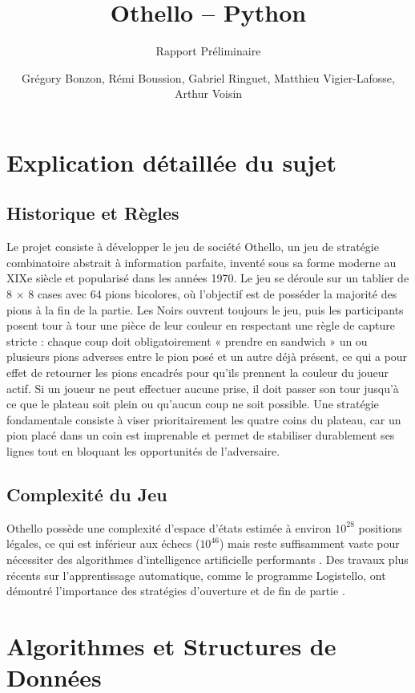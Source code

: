 \documentclass[a4paper]{article}
\title{Othello -- Python}
\subtitle{Rapport Préliminaire}
\author{
    Grégory Bonzon,
    Rémi Boussion,
    Gabriel Ringuet,
    Matthieu Vigier-Lafosse,
    Arthur Voisin
}
\begin{document}
\maketitle
\thispagestyle{empty}


\section{Explication détaillée du sujet}

\subsection{Historique et Règles}
Le projet consiste à développer le jeu de société Othello, un jeu de stratégie combinatoire abstrait à information parfaite, inventé sous sa forme moderne au XIXe siècle et popularisé dans les années 1970. Le jeu se déroule sur un tablier de 8 × 8 cases avec 64 pions bicolores, où l'objectif est de posséder la majorité des pions à la fin de la partie. Les Noirs ouvrent toujours le jeu, puis les participants posent tour à tour une pièce de leur couleur en respectant une règle de capture stricte : chaque coup doit obligatoirement « prendre en sandwich » un ou plusieurs pions adverses entre le pion posé et un autre déjà présent, ce qui a pour effet de retourner les pions encadrés pour qu'ils prennent la couleur du joueur actif. Si un joueur ne peut effectuer aucune prise, il doit passer son tour jusqu'à ce que le plateau soit plein ou qu'aucun coup ne soit possible. Une stratégie fondamentale consiste à viser prioritairement les quatre coins du plateau, car un pion placé dans un coin est imprenable et permet de stabiliser durablement ses lignes tout en bloquant les opportunités de l'adversaire.

\subsection{Complexité du Jeu}
Othello possède une complexité d'espace d'états estimée à environ $10^{28}$ positions légales, ce qui est inférieur aux échecs ($10^{46}$) mais reste suffisamment vaste pour nécessiter des algorithmes d'intelligence artificielle performants \cite{rosenbloom, lee}. Des travaux plus récents sur l'apprentissage automatique, comme le programme Logistello, ont démontré l'importance des stratégies d'ouverture et de fin de partie \cite{buro}.

\section{Algorithmes et Structures de Données}
\end{document}
